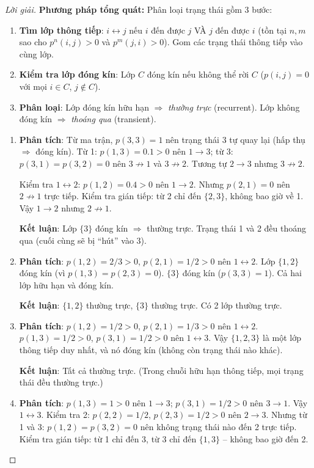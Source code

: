\documentclass[8pt,a4paper]{article}
\newenvironment{solution}{\begin{proof}[Lời giải]}{\end{proof}}
\begin{document}
\begin{solution}
\textbf{Phương pháp tổng quát:} Phân loại trạng thái gồm 3 bước:
\begin{enumerate}
  \item \textbf{Tìm lớp thông tiếp}: $i \leftrightarrow j$ nếu $i$ đến được $j$ VÀ $j$ đến được $i$ (tồn tại $n,m$ sao cho $p^n(i,j)>0$ và $p^m(j,i)>0$). Gom các trạng thái thông tiếp vào cùng lớp.
  \item \textbf{Kiểm tra lớp đóng kín}: Lớp $C$ đóng kín nếu không thể rời $C$ ($p(i,j)=0$ với mọi $i\in C$, $j\notin C$).
  \item \textbf{Phân loại}: Lớp đóng kín hữu hạn $\Rightarrow$ \emph{thường trực} (recurrent). Lớp không đóng kín $\Rightarrow$ \emph{thoáng qua} (transient).
\end{enumerate}

\begin{enumerate}[label=(\alph*)]
\item \textbf{Phân tích}: Từ ma trận, $p(3,3)=1$ nên trạng thái 3 tự quay lại (hấp thụ $\Rightarrow$ đóng kín). Từ 1: $p(1,3)=0.1>0$ nên $1\to 3$; từ 3: $p(3,1)=p(3,2)=0$ nên $3\not\to 1$ và $3\not\to 2$. Tương tự $2\to 3$ nhưng $3\not\to 2$.

Kiểm tra $1\leftrightarrow 2$: $p(1,2)=0.4>0$ nên $1\to 2$. Nhưng $p(2,1)=0$ nên $2\not\to 1$ trực tiếp. Kiểm tra gián tiếp: từ 2 chỉ đến $\{2,3\}$, không bao giờ về 1. Vậy $1\to 2$ nhưng $2\not\to 1$.

\textbf{Kết luận}: Lớp $\{3\}$ đóng kín $\Rightarrow$ thường trực. Trạng thái 1 và 2 đều thoáng qua (cuối cùng sẽ bị ``hút'' vào 3).

\item \textbf{Phân tích}: $p(1,2)=2/3>0$, $p(2,1)=1/2>0$ nên $1\leftrightarrow 2$. Lớp $\{1,2\}$ đóng kín (vì $p(1,3)=p(2,3)=0$). $\{3\}$ đóng kín ($p(3,3)=1$). Cả hai lớp hữu hạn và đóng kín.

\textbf{Kết luận}: $\{1,2\}$ thường trực, $\{3\}$ thường trực. Có 2 lớp thường trực.

\item \textbf{Phân tích}: $p(1,2)=1/2>0$, $p(2,1)=1/3>0$ nên $1\leftrightarrow 2$. $p(1,3)=1/2>0$, $p(3,1)=1/2>0$ nên $1\leftrightarrow 3$. Vậy $\{1,2,3\}$ là một lớp thông tiếp duy nhất, và nó đóng kín (không còn trạng thái nào khác).

\textbf{Kết luận}: Tất cả thường trực. (Trong chuỗi hữu hạn thông tiếp, mọi trạng thái đều thường trực.)

\item \textbf{Phân tích}: $p(1,3)=1>0$ nên $1\to 3$; $p(3,1)=1/2>0$ nên $3\to 1$. Vậy $1\leftrightarrow 3$. Kiểm tra 2: $p(2,2)=1/2$, $p(2,3)=1/2>0$ nên $2\to 3$. Nhưng từ 1 và 3: $p(1,2)=p(3,2)=0$ nên không trạng thái nào đến 2 trực tiếp. Kiểm tra gián tiếp: từ 1 chỉ đến 3, từ 3 chỉ đến $\{1,3\}$ -- không bao giờ đến 2.


\end{enumerate}
\end{solution}
\end{document}
